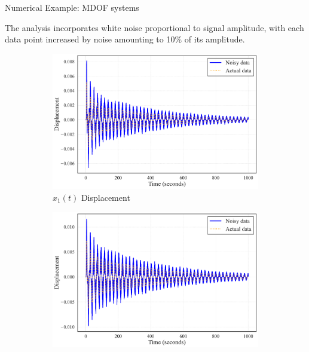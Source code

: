 \documentclass{beamer}
\begin{document}
\begin{frame}{Numerical Example: MDOF systems}

  The analysis incorporates white noise proportional to signal amplitude, with each data point increased by noise amounting to 10\% of its amplitude.

  \begin{figure}[!ht]
    \centering
    \begin{subfigure}{0.31\textwidth}
        \centering
        \includegraphics[width=\textwidth]{noised_displacement_vs_actual_mass_1.pdf}
        \caption{ $x_1(t)$ Displacement}
    \end{subfigure}
    \hspace{0.5em}%
    \begin{subfigure}{0.31\textwidth}
        \centering
        \includegraphics[width=\textwidth]{noised_displacement_vs_actual_mass_2.pdf}

\end{subfigure}
\end{figure}
\end{frame}
\end{document}
